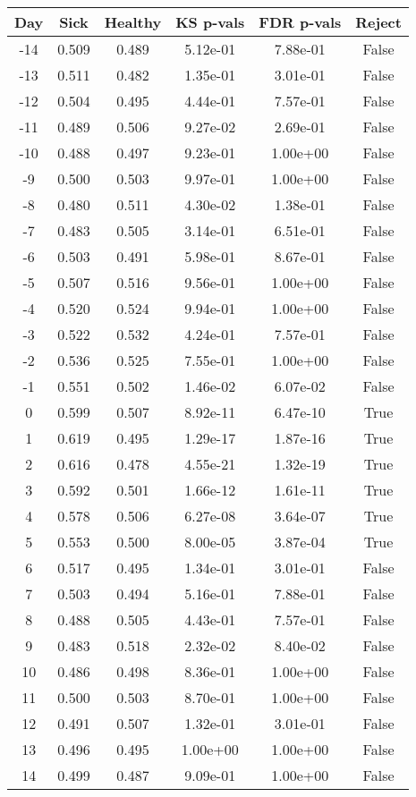 \begin{tabular}{c|c|c|c|c|c}
Day &  Sick & Healthy &  KS p-vals & FDR p-vals & Reject\\
\hline
-14 & 0.509 &   0.489 &   5.12e-01 &   7.88e-01 &  False\\
-13 & 0.511 &   0.482 &   1.35e-01 &   3.01e-01 &  False\\
-12 & 0.504 &   0.495 &   4.44e-01 &   7.57e-01 &  False\\
-11 & 0.489 &   0.506 &   9.27e-02 &   2.69e-01 &  False\\
-10 & 0.488 &   0.497 &   9.23e-01 &   1.00e+00 &  False\\
 -9 & 0.500 &   0.503 &   9.97e-01 &   1.00e+00 &  False\\
 -8 & 0.480 &   0.511 &   4.30e-02 &   1.38e-01 &  False\\
 -7 & 0.483 &   0.505 &   3.14e-01 &   6.51e-01 &  False\\
 -6 & 0.503 &   0.491 &   5.98e-01 &   8.67e-01 &  False\\
 -5 & 0.507 &   0.516 &   9.56e-01 &   1.00e+00 &  False\\
 -4 & 0.520 &   0.524 &   9.94e-01 &   1.00e+00 &  False\\
 -3 & 0.522 &   0.532 &   4.24e-01 &   7.57e-01 &  False\\
 -2 & 0.536 &   0.525 &   7.55e-01 &   1.00e+00 &  False\\
 -1 & 0.551 &   0.502 &   1.46e-02 &   6.07e-02 &  False\\
  0 & 0.599 &   0.507 &   8.92e-11 &   6.47e-10 &   True\\
  1 & 0.619 &   0.495 &   1.29e-17 &   1.87e-16 &   True\\
  2 & 0.616 &   0.478 &   4.55e-21 &   1.32e-19 &   True\\
  3 & 0.592 &   0.501 &   1.66e-12 &   1.61e-11 &   True\\
  4 & 0.578 &   0.506 &   6.27e-08 &   3.64e-07 &   True\\
  5 & 0.553 &   0.500 &   8.00e-05 &   3.87e-04 &   True\\
  6 & 0.517 &   0.495 &   1.34e-01 &   3.01e-01 &  False\\
  7 & 0.503 &   0.494 &   5.16e-01 &   7.88e-01 &  False\\
  8 & 0.488 &   0.505 &   4.43e-01 &   7.57e-01 &  False\\
  9 & 0.483 &   0.518 &   2.32e-02 &   8.40e-02 &  False\\
 10 & 0.486 &   0.498 &   8.36e-01 &   1.00e+00 &  False\\
 11 & 0.500 &   0.503 &   8.70e-01 &   1.00e+00 &  False\\
 12 & 0.491 &   0.507 &   1.32e-01 &   3.01e-01 &  False\\
 13 & 0.496 &   0.495 &   1.00e+00 &   1.00e+00 &  False\\
 14 & 0.499 &   0.487 &   9.09e-01 &   1.00e+00 &  False\\
\end{tabular}